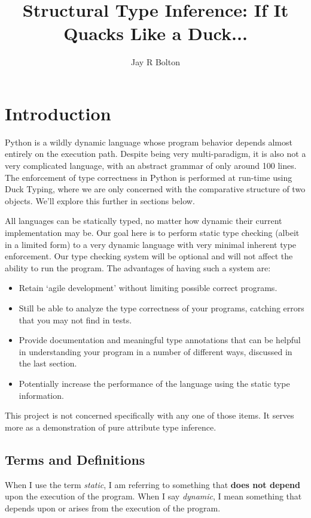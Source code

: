 \documentclass{article}
\title{Structural Type Inference: If It Quacks Like a Duck...}
\author{Jay R Bolton}
\begin{document}
\maketitle

\section*{Introduction}

Python is a wildly dynamic language whose program behavior depends almost
entirely on the execution path. Despite being very multi-paradigm, it is also
not a very complicated language, with an abstract grammar of only around 100
lines. The enforcement of type correctness in Python is performed at run-time
using Duck Typing, where we are only concerned with the comparative structure
of two objects. We'll explore this further in sections below.

All languages can be statically typed, no matter how dynamic their current
implementation may be. Our goal here is to perform static type checking (albeit
in a limited form) to a very dynamic language with very minimal inherent type
enforcement. Our type checking system will be optional and will not affect the
ability to run the program. The advantages of having such a system are:

\begin{itemize}
\item Retain `agile development' without limiting possible correct programs.
\item Still be able to analyze the type correctness of your programs, catching errors that you may not find in tests.
\item Provide documentation and meaningful type annotations that can be helpful
in understanding your program in a number of different ways, discussed in the
last section.
\item Potentially increase the performance of the language using the static type information.
\end{itemize}

This project is not concerned specifically with any one of those items. It
serves more as a demonstration of pure attribute type inference.

\subsection*{Terms and Definitions}

When I use the term \emph{static}, I am referring to something that
\textbf{does not depend} upon the execution of the program. When I say
\emph{dynamic}, I mean something that depends upon or arises from the execution
of the program.
\end{document}
